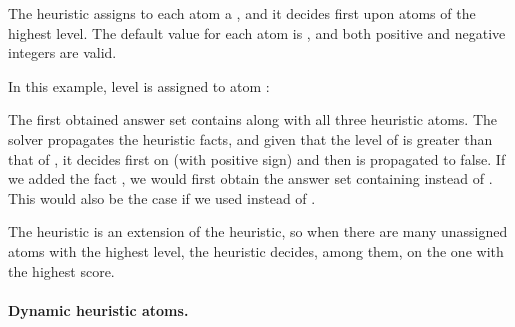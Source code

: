 The  heuristic assigns to each atom a , and it decides first upon atoms of the highest level.
The default value for each atom is ,  and both positive and negative integers are valid.
\begin{example} 
\label{example:level}
In this example,  
level  is assigned to atom :

The first obtained answer set contains  along with all three heuristic atoms.
The solver propagates the heuristic facts, and given that the level of  is greater than that of ,
it decides first on  (with positive sign) and then  is propagated to false.
If we added the fact , 
we would first obtain the answer set containing  instead of .
This would also be the case if we used  instead of .
\end{example}

\begin{note}
The  heuristic is an extension of the  heuristic, 
so when there are many unassigned atoms with the highest level,
the heuristic decides, among them, on the one with the highest  score.
\end{note}

\paragraph{Dynamic heuristic atoms.}

